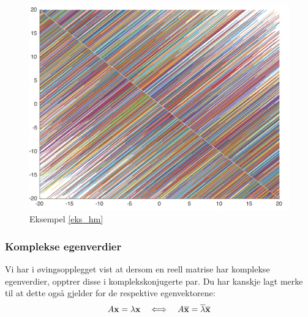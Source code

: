 \begin{figure}[htbp]
  \begin{center}
	\includegraphics[scale=.1]{eks_hm.jpg}	
	\captionsetup{labelformat=empty}
	\caption{Eksempel \ref{eks_hm}}
	\end{center}
\end{figure}


\subsubsection*{Komplekse egenverdier}
Vi har i øvingsopplegget vist at dersom en reell matrise har komplekse egenverdier, opptrer disse i komplekskonjugerte par.
Du har kanskje lagt merke til at dette også gjelder for de respektive egenvektorene:
\[
A\mathbf{x}=\lambda \mathbf{x} \quad \Longleftrightarrow \quad A \overline {\mathbf{x}} =\overline{ \lambda} \overline {\mathbf{x}}
\]

